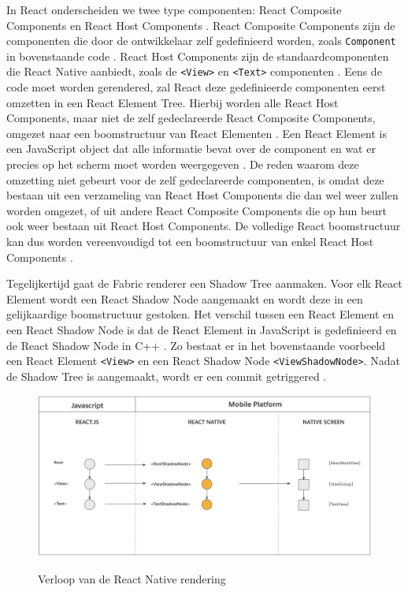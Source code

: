 In React onderscheiden we twee type componenten: React Composite Components en React Host Components \autocite{Bron15}. React Composite Components zijn de componenten die door de ontwikkelaar zelf gedefinieerd worden, zoals \verb|Component| in bovenstaande code \autocite{Bron16}. React Host Components zijn de standaardcomponenten die React Native aanbiedt, zoals de \verb|<View>| en \verb|<Text>| componenten \autocite{Bron16}. Eens de code moet worden gerendered, zal React deze gedefinieerde componenten eerst omzetten in een React Element Tree. Hierbij worden alle React Host Components, maar niet de zelf gedeclareerde React Composite Components, omgezet naar een boomstructuur van React Elementen \autocite{Bron15}. Een React Element is een JavaScript object dat alle informatie bevat over de component en wat er precies op het scherm moet worden weergegeven \autocite{Bron16}. De reden waarom deze omzetting niet gebeurt voor de zelf gedeclareerde componenten, is omdat deze bestaan uit een verzameling van React Host Components die dan wel weer zullen worden omgezet, of uit andere React Composite Components die op hun beurt ook weer bestaan uit React Host Components. De volledige React boomstructuur kan dus worden vereenvoudigd tot een boomstructuur van enkel React Host Components \autocite{Bron15}.

Tegelijkertijd gaat de Fabric renderer een Shadow Tree aanmaken. Voor elk React Element wordt een React Shadow Node aangemaakt en wordt deze in een gelijkaardige boomstructuur gestoken. Het verschil tussen een React Element en een React Shadow Node is dat de React Element in JavaScript is gedefinieerd en de React Shadow Node in C++ \autocite{Bron16}. Zo bestaat er in het bovenstaande voorbeeld een React Element \verb|<View>| en een React Shadow Node \verb|<ViewShadowNode>|. Nadat de Shadow Tree is aangemaakt, wordt er een commit getriggered \autocite{Bron15}.

\begin{figure}
  \centering
  \includegraphics[width=0.9\linewidth]{img/reactNativeRender}
  \caption{Verloop van de React Native rendering}
  \label{fig:Verloop van de React Native rendering} \autocite{Bron15IMG}
\end{figure}

